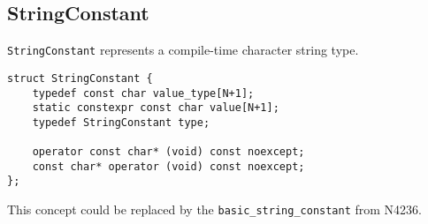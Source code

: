 \subsection{StringConstant}
\label{concept-StringConstant}

\texttt{StringConstant} represents a compile-time character string type. 

\begin{verbatim}
struct StringConstant {
	typedef const char value_type[N+1];
	static constexpr const char value[N+1];
	typedef StringConstant type;

	operator const char* (void) const noexcept;
	const char* operator (void) const noexcept;
};
\end{verbatim}

This concept could be replaced by the \texttt{basic\_string\_constant}
from N4236.
